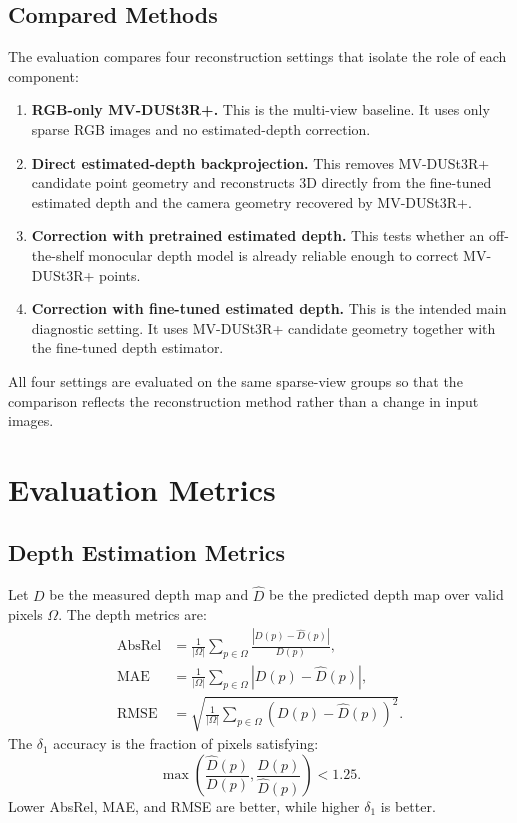\documentclass[12pt,a4paper]{article}
\newcommand{\mvdp}{MV-DUSt3R+}
\begin{document}
\subsection{Compared Methods}
The evaluation compares four reconstruction settings that isolate the role of each component:
\begin{enumerate}[leftmargin=1.2cm]
    \item \textbf{RGB-only \mvdp{}.} This is the multi-view baseline. It uses only sparse RGB images and no estimated-depth correction.
    \item \textbf{Direct estimated-depth backprojection.} This removes \mvdp{} candidate point geometry and reconstructs 3D directly from the fine-tuned estimated depth and the camera geometry recovered by \mvdp{}.
    \item \textbf{Correction with pretrained estimated depth.} This tests whether an off-the-shelf monocular depth model is already reliable enough to correct \mvdp{} points.
    \item \textbf{Correction with fine-tuned estimated depth.} This is the intended main diagnostic setting. It uses \mvdp{} candidate geometry together with the fine-tuned depth estimator.
\end{enumerate}
All four settings are evaluated on the same sparse-view groups so that the comparison reflects the reconstruction method rather than a change in input images.

\section{Evaluation Metrics}
\subsection{Depth Estimation Metrics}
Let \(D\) be the measured depth map and \(\hat{D}\) be the predicted depth map over valid pixels \(\Omega\). The depth metrics are:
\begin{align}
\mathrm{AbsRel} &= \frac{1}{|\Omega|}\sum_{p\in\Omega}\frac{|D(p)-\hat{D}(p)|}{D(p)},\\
\mathrm{MAE} &= \frac{1}{|\Omega|}\sum_{p\in\Omega}|D(p)-\hat{D}(p)|,\\
\mathrm{RMSE} &= \sqrt{\frac{1}{|\Omega|}\sum_{p\in\Omega}\left(D(p)-\hat{D}(p)\right)^2}.
\end{align}
The \(\delta_1\) accuracy is the fraction of pixels satisfying:
\begin{equation}
\max\left(\frac{\hat{D}(p)}{D(p)},\frac{D(p)}{\hat{D}(p)}\right)<1.25.
\end{equation}
Lower AbsRel, MAE, and RMSE are better, while higher \(\delta_1\) is better.
\end{document}
